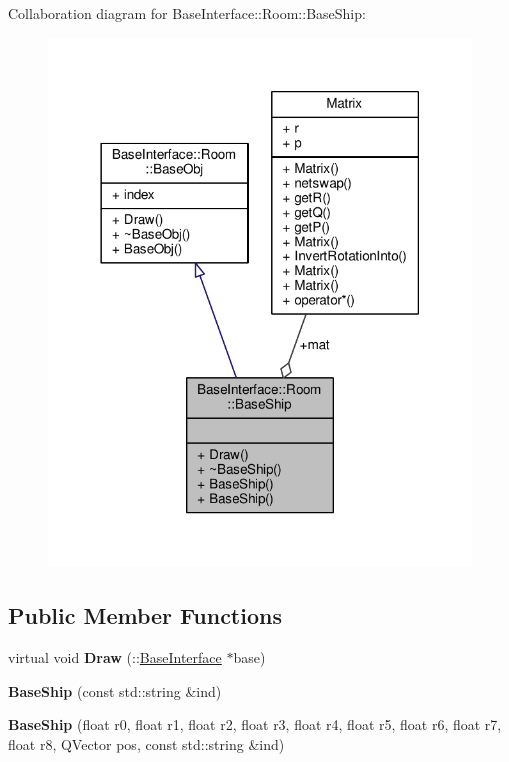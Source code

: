 Collaboration diagram for Base\+Interface\+:\+:Room\+:\+:Base\+Ship\+:
\nopagebreak
\begin{figure}[H]
\begin{center}
\leavevmode
\includegraphics[width=318pt]{de/d30/classBaseInterface_1_1Room_1_1BaseShip__coll__graph}
\end{center}
\end{figure}
\subsection*{Public Member Functions}
\begin{DoxyCompactItemize}
\item 
virtual void {\bfseries Draw} (\+::\hyperlink{classBaseInterface}{Base\+Interface} $\ast$base)\hypertarget{classBaseInterface_1_1Room_1_1BaseShip_a0a443f674557748f050c10201eb88cc2}{}\label{classBaseInterface_1_1Room_1_1BaseShip_a0a443f674557748f050c10201eb88cc2}

\item 
{\bfseries Base\+Ship} (const std\+::string \&ind)\hypertarget{classBaseInterface_1_1Room_1_1BaseShip_a76564a081e1afd1a5e8c2d544c1154a2}{}\label{classBaseInterface_1_1Room_1_1BaseShip_a76564a081e1afd1a5e8c2d544c1154a2}

\item 
{\bfseries Base\+Ship} (float r0, float r1, float r2, float r3, float r4, float r5, float r6, float r7, float r8, Q\+Vector pos, const std\+::string \&ind)\hypertarget{classBaseInterface_1_1Room_1_1BaseShip_aa4a25d6e54f67963801265522a11924b}{}\label{classBaseInterface_1_1Room_1_1BaseShip_aa4a25d6e54f67963801265522a11924b}

\end{DoxyCompactItemize}
